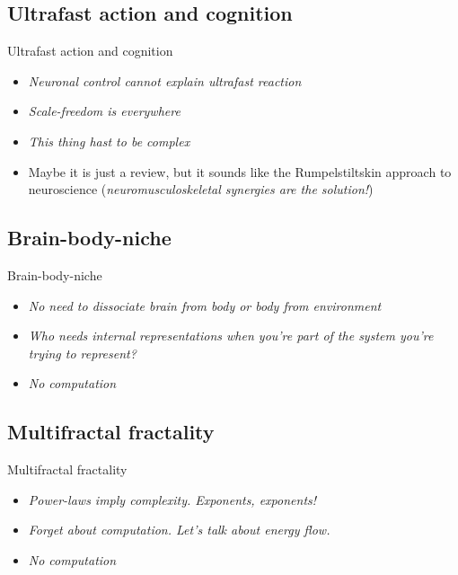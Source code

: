 \documentclass[xcolor=x11names,compress]{beamer}
\renewcommand{\(}{\begin{columns}}
\renewcommand{\)}{\end{columns}}
\newcommand{\<}[1]{\begin{column}{#1}}
\renewcommand{\>}{\end{column}}
\begin{document}
\subsection{Ultrafast action and cognition}
\begin{frame}{Ultrafast action and cognition}


\begin{itemize}
    \item \emph{Neuronal control cannot explain ultrafast reaction}
    \item \emph{Scale-freedom is everywhere}
    \item \emph{This thing hast to be complex}
    \item Maybe it is just a review, but it sounds like the Rumpelstiltskin approach to neuroscience (\emph{neuromusculoskeletal synergies are the solution!})
\end{itemize}
\end{frame}

\subsection{Brain-body-niche}
\begin{frame}{Brain-body-niche}

\begin{itemize}
    \item \emph{No need to dissociate brain from body or body from environment}
    \item \emph{Who needs internal representations when you're part of the system you're trying to represent?}
    \item \emph{No computation}
\end{itemize}
\end{frame}

\subsection{Multifractal fractality}
\begin{frame}{Multifractal fractality}
\begin{itemize}
    \item \emph{Power-laws imply complexity. Exponents, exponents!}
    \item \emph{Forget about computation. Let's talk about energy flow.}
    \item \emph{No computation}
\end{itemize}

\end{frame}
\end{document}

